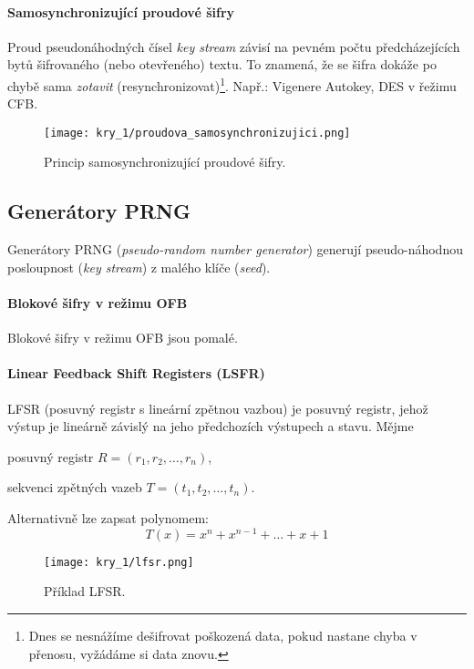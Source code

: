 \paragraph*{Samosynchronizující proudové šifry} Proud pseudonáhodných čísel \textit{key stream} závisí na pevném počtu předcházejících bytů šifrovaného (nebo otevřeného) textu. To znamená, že se šifra dokáže po chybě sama \textit{zotavit} (resynchronizovat)\footnote{Dnes se nesnážíme dešifrovat poškozená data, pokud nastane chyba v přenosu, vyžádáme si data znovu.}. Např.: Vigenere Autokey, DES v řežimu CFB.

\begin{figure}[H]
    \centering
    \texttt{[image: kry\_1/proudova\_samosynchronizujici.png]}
    \caption{Princip samosynchronizující proudové šifry.}
\end{figure}

\subsection*{Generátory PRNG}

Generátory PRNG (\textit{pseudo-random number generator}) generují pseudo-náhodnou pos\-loupnost (\textit{key stream}) z malého klíče (\textit{seed}).

\paragraph*{Blokové šifry v režimu OFB} Blokové šifry v režimu OFB jsou pomalé.

\paragraph*{Linear Feedback Shift Registers (LSFR)} LFSR (posuvný registr s lineární zpětnou vazbou) je posuvný registr, jehož výstup je lineárně závislý na jeho předchozích výstupech a stavu. Mějme \begin{compactitem}
    \item posuvný registr $R = (r_1, r_2, \dots, r_n)$,
    \item sekvenci zpětných vazeb $T = (t_1, t_2, \dots, t_n)$.
\end{compactitem}

\noindent Alternativně lze zapsat polynomem: $$
T(x) = x^n + x^{n-1} + \ldots + x + 1
$$

\begin{figure}[H]
    \centering
    \texttt{[image: kry\_1/lfsr.png]}
    \caption{Příklad LFSR.}
\end{figure}

